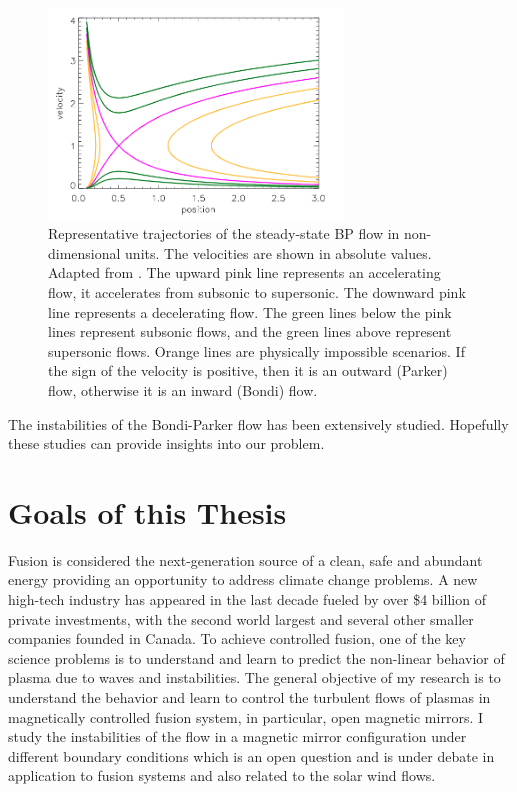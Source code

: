 \begin{figure}[htbp]
	\centering
	\includegraphics[width=0.7\textwidth]{figures/steady-state-BP-flow}
	\caption{Representative trajectories of the steady-state BP flow in non-dimensional units. The velocities are shown in absolute values. Adapted from \cite{keto_stability_2020}. The upward pink line represents an accelerating flow, it accelerates from subsonic to supersonic. The downward pink line represents a decelerating flow. The green lines below the pink lines represent subsonic flows, and the green lines above represent supersonic flows. Orange lines are physically impossible scenarios. If the sign of the velocity is positive, then it is an outward (Parker) flow, otherwise it is an inward (Bondi) flow.}
	\label{fig:BP-flow-velocity}
\end{figure}

The instabilities of the Bondi-Parker flow has been extensively studied. \cite{bbondi_spherically_1952,velli_from_1994,velli_hydrodynamics_2001,del_dynamical_1998,keto_stability_2020} Hopefully these studies can provide insights into our problem.

\section{Goals of this Thesis}
Fusion is considered the next-generation source of a clean, safe and abundant energy providing an opportunity to address climate change problems. A new high-tech industry has appeared in the last decade fueled by over \$4 billion of private investments, with the second world largest and several other smaller companies founded in Canada. To achieve controlled fusion, one of the key science problems is to understand and learn to predict the non-linear behavior of plasma due to waves and instabilities. The general objective of my research is to understand the behavior and learn to control the turbulent flows of plasmas in magnetically controlled fusion system, in particular, open magnetic mirrors. I study the instabilities of the flow in a magnetic mirror configuration under different boundary conditions which is an open question and is under debate in application to fusion systems and also related to the solar wind flows.


